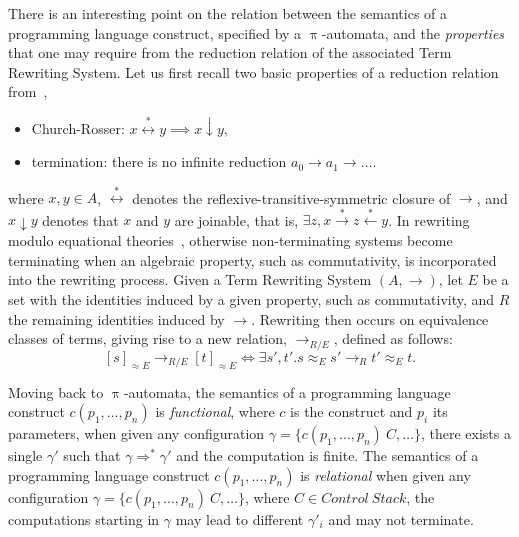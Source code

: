 \documentclass{llncs}%
\begin{document}
There is an interesting point on the relation between the
semantics of a programming language construct, specified by a
$\uppi$-automata, and the \emph{properties} that one
may require from the reduction relation of the associated Term
Rewriting System. Let us first recall two basic properties of a reduction relation
from~\cite[Def.2.1.3]{Baader:1998:TR:280474},
\begin{itemize}
\item Church-Rosser: $x \stackrel{*}{\longleftrightarrow} y \implies x
  \downarrow y$,
\item termination: there is no infinite reduction $a_0 \rightarrow a_1
  \rightarrow \ldots$.
\end{itemize}
where $x, y \in A$, $\stackrel{*}{\longleftrightarrow}$ denotes the
reflexive-transitive-symmetric closure of $\longrightarrow$, and
$x \downarrow y$ denotes that $x$ and $y$ are joinable, that is,
$\exists z, x \stackrel{*}{\longrightarrow} z
\stackrel{*}\longleftarrow y$.  In rewriting modulo equational
theories~\cite[Ch. 11]{Baader:1998:TR:280474}, otherwise
non-terminating systems become terminating when an algebraic property,
such as commutativity, is incorporated into the rewriting process. Given a
Term Rewriting System $(A, \longrightarrow)$, let $E$ be a set with
the identities induced by a given property, such as commutativity, and
$R$ the remaining identities induced by $\longrightarrow$. Rewriting
then occurs on equivalence classes of terms, giving rise to a new
relation, $\longrightarrow_{R/E}$, defined as follows:
$$
[s]_{\approx E} \longrightarrow_{R/E} [t]_{\approx E} \Leftrightarrow
\exists s', t'. s \approx_E s' \longrightarrow_R t' \approx_E t.
$$


Moving back to $\uppi$-automata, the
semantics of a programming language construct $c(p_1, \ldots, p_n)$ is
\emph{functional}, where $c$ is the construct and $p_i$ its
parameters, when given any configuration
$\gamma = \{ c(p_1, \ldots, p_n) ~C, \ldots\}$, there exists a single
$\gamma'$ such that $\gamma \Rightarrow^* \gamma'$ and the computation is finite. The semantics of a
programming language construct $c(p_1, \ldots, p_n)$ is
\emph{relational} when given any configuration
$\gamma = \{ c(p_1, \ldots, p_n)~ C, \ldots\}$, where
$C \in \mathit{Control~Stack}$, the computations starting in $\gamma$ may lead to different $\gamma'_i$ and 
may not terminate.
\end{document}
